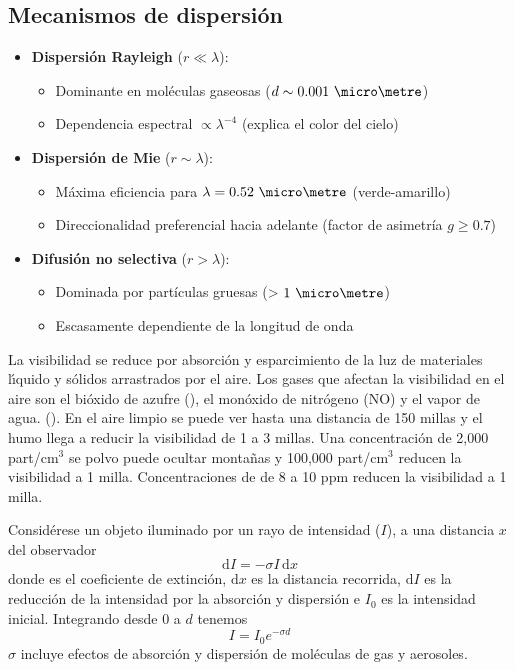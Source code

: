 \subsection{Mecanismos de dispersión}\label{mddis}
\begin{itemize}
    \item \textbf{Dispersión Rayleigh} ($r \ll \lambda$):
    \begin{itemize}
        \item Dominante en moléculas gaseosas ($d \sim 0.001\ \micro\metre$)
        \item Dependencia espectral $\propto \lambda^{-4}$ (explica el color del cielo)
    \end{itemize}
    
    \item \textbf{Dispersión de Mie} ($r \sim \lambda$):
    \begin{itemize}
        \item Máxima eficiencia para $\lambda = 0.52\ \micro\metre$ (verde-amarillo)
        \item Direccionalidad preferencial hacia adelante (factor de asimetría $g \geq 0.7$)
    \end{itemize}
    
    \item \textbf{Difusión no selectiva} ($r > \lambda$):
    \begin{itemize}
        \item Dominada por partículas gruesas (> $1\ \micro\metre$)
        \item Escasamente dependiente de la longitud de onda
    \end{itemize}
\end{itemize}

La visibilidad se reduce por absorci\'on y esparcimiento de la luz de  materiales l\'{\i}quido y s\'olidos arrastrados por el aire. Los gases que afectan la visibilidad en el aire son el bi\'oxido de azufre (), el mon\'oxido de nitr\'ogeno (NO) y el vapor de agua. (). En el aire limpio se puede ver hasta una distancia de 150 millas y el humo llega a reducir la visibilidad de 1 a 3 millas. Una concentraci\'on de 2,000 part/cm$^3$ se polvo puede ocultar monta\~nas y 100,000 part/cm$^3$ reducen la visibilidad a 1 milla. Concentraciones de  de 8 a 10 ppm reducen la visibilidad a 1 milla.

Consid\'erese un objeto iluminado por un rayo de intensidad ($I$), a una distancia $x$ del observador
\begin{equation}
\mathrm{d}I=-\sigma I\, \mathrm{d}x
\end{equation}
donde  es el coeficiente de extinci\'on, $\mathrm{d}x$ es la distancia recorrida, $\mathrm{d}I$ es la reducci\'on de la intensidad por la absorci\'on y dispersi\'on e $I_0$ es la intensidad inicial. Integrando desde 0 a $d$ tenemos
\begin{equation}
I =I_0 e^{-\sigma d}
\end{equation}
$\sigma$ incluye efectos de absorci\'on y dispersi\'on de mol\'eculas de gas y aerosoles.

